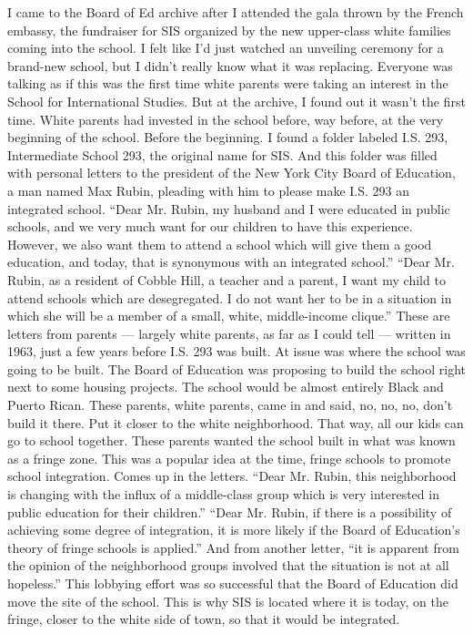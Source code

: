 I came to the Board of Ed archive after I attended the gala thrown by
the French embassy, the fundraiser for SIS organized by the new
upper-class white families coming into the school. I felt like I'd just
watched an unveiling ceremony for a brand-new school, but I didn't
really know what it was replacing. Everyone was talking as if this was
the first time white parents were taking an interest in the School for
International Studies. But at the archive, I found out it wasn't the
first time. White parents had invested in the school before, way before,
at the very beginning of the school. Before the beginning. I found a
folder labeled I.S. 293, Intermediate School 293, the original name for
SIS. And this folder was filled with personal letters to the president
of the New York City Board of Education, a man named Max Rubin, pleading
with him to please make I.S. 293 an integrated school. ``Dear Mr. Rubin,
my husband and I were educated in public schools, and we very much want
for our children to have this experience. However, we also want them to
attend a school which will give them a good education, and today, that
is synonymous with an integrated school.'' ``Dear Mr. Rubin, as a
resident of Cobble Hill, a teacher and a parent, I want my child to
attend schools which are desegregated. I do not want her to be in a
situation in which she will be a member of a small, white, middle-income
clique.'' These are letters from parents --- largely white parents, as
far as I could tell --- written in 1963, just a few years before I.S.
293 was built. At issue was where the school was going to be built. The
Board of Education was proposing to build the school right next to some
housing projects. The school would be almost entirely Black and Puerto
Rican. These parents, white parents, came in and said, no, no, no, don't
build it there. Put it closer to the white neighborhood. That way, all
our kids can go to school together. These parents wanted the school
built in what was known as a fringe zone. This was a popular idea at the
time, fringe schools to promote school integration. Comes up in the
letters. ``Dear Mr. Rubin, this neighborhood is changing with the influx
of a middle-class group which is very interested in public education for
their children.'' ``Dear Mr. Rubin, if there is a possibility of
achieving some degree of integration, it is more likely if the Board of
Education's theory of fringe schools is applied.'' And from another
letter, ``it is apparent from the opinion of the neighborhood groups
involved that the situation is not at all hopeless.'' This lobbying
effort was so successful that the Board of Education did move the site
of the school. This is why SIS is located where it is today, on the
fringe, closer to the white side of town, so that it would be
integrated.

